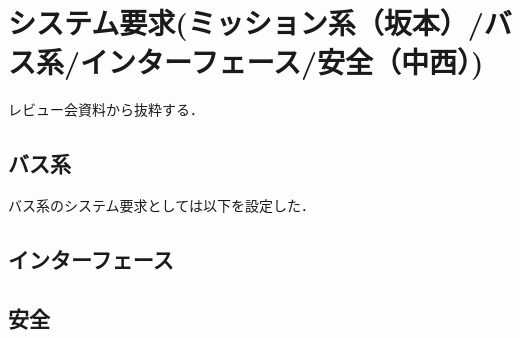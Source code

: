 \section{システム要求(ミッション系（坂本）/バス系/インターフェース/安全（中西）)}

レビュー会資料から抜粋する．




\subsection{バス系}
バス系のシステム要求としては以下を設定した．

\subsection{インターフェース}

\subsection{安全}
